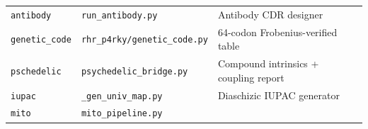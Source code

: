 \begin{longtable}[]{@{}lll@{}}
\begin{minipage}[t]{0.24\columnwidth}\raggedright
\texttt{antibody}\strut
\end{minipage} & \begin{minipage}[t]{0.24\columnwidth}\raggedright
\texttt{run\_antibody.py}\strut
\end{minipage} & \begin{minipage}[t]{0.43\columnwidth}\raggedright
Antibody CDR designer\strut
\end{minipage}\tabularnewline
\begin{minipage}[t]{0.24\columnwidth}\raggedright
\texttt{genetic\_code}\strut
\end{minipage} & \begin{minipage}[t]{0.24\columnwidth}\raggedright
\texttt{rhr\_p4rky/genetic\_code.py}\strut
\end{minipage} & \begin{minipage}[t]{0.43\columnwidth}\raggedright
64-codon Frobenius-verified table\strut
\end{minipage}\tabularnewline
\begin{minipage}[t]{0.24\columnwidth}\raggedright
\texttt{pschedelic}\strut
\end{minipage} & \begin{minipage}[t]{0.24\columnwidth}\raggedright
\texttt{psychedelic\_bridge.py}\strut
\end{minipage} & \begin{minipage}[t]{0.43\columnwidth}\raggedright
Compound intrinsics + coupling report\strut
\end{minipage}\tabularnewline
\begin{minipage}[t]{0.24\columnwidth}\raggedright
\texttt{iupac}\strut
\end{minipage} & \begin{minipage}[t]{0.24\columnwidth}\raggedright
\texttt{\_gen\_univ\_map.py}\strut
\end{minipage} & \begin{minipage}[t]{0.43\columnwidth}\raggedright
Diaschizic IUPAC generator\strut
\end{minipage}\tabularnewline
\begin{minipage}[t]{0.24\columnwidth}\raggedright
\texttt{mito}\strut
\end{minipage} & \begin{minipage}[t]{0.24\columnwidth}\raggedright
\texttt{mito\_pipeline.py}\strut
\end{minipage} & \begin{minipage}[t]{0.43\columnwidth}\raggedright

\end{minipage}
\end{longtable}
